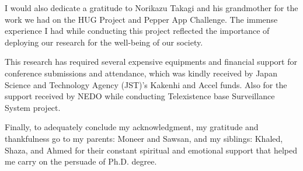I would also dedicate a gratitude to Norikazu Takagi and his grandmother for the work we had on the HUG Project and Pepper App Challenge. The immense experience I had while conducting this project reflected the importance of deploying our research for the well-being of our society.

This research has required several expensive equipments and financial support for conference submissions and attendance, which was kindly received by Japan Science and Technology Agency (JST)'s Kakenhi and Accel funds. Also for the support received by NEDO while conducting Telexistence base Surveillance System project. 

Finally, to adequately conclude my acknowledgment, my gratitude and thankfulness go to my parents: Moneer and Sawsan, and my siblings: Khaled, Shaza, and Ahmed for their constant spiritual and emotional support that helped me carry on the persuade of Ph.D. degree. 
